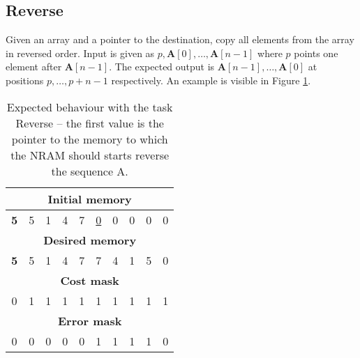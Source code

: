 \subsection{Reverse}
Given an array and a pointer to the destination, copy all elements from the array in reversed order. Input is given as $p, \textbf{A}[0], \dots, \textbf{A}[n-1]$ where $p$ points one element after $\textbf{A}[n-1]$. The expected output is $\textbf{A}[n-1], \dots, \textbf{A}[0]$ at positions $p, \dots, p+n-1$ respectively. An example is visible in Figure \ref{fig:reverse-example}.
\begin{table}[h!]
	\centering
	\begin{tabular}{|c|c|c|c|c|c|c|c|c|c|}
		\hline
		\multicolumn{10}{|c|}{\textbf{Initial memory}} \\ \hline
		\textbf{5} & 5 & 1 & 4 & 7 & \underline{0} & 0 & 0 & 0 & 0 \\ \hline\hline\hline
		\multicolumn{10}{|c|}{\textbf{Desired memory}} \\ \hline
		\textbf{5} & 5 & 1 & 4 & 7 & 7 & 4 & 1 & 5 & 0 \\ \hline\hline\hline
		\multicolumn{10}{|c|}{\textbf{Cost mask}} \\ \hline
		0 & 1 & 1 & 1 & 1 & 1 & 1 & 1 & 1 & 1 \\ \hline\hline\hline
		
		\multicolumn{10}{|c|}{\textbf{Error mask}} \\ \hline
		0 & 0 & 0 & 0 & 0 & 1 & 1 & 1 & 1 & 0 \\ \hline
	\end{tabular}
	\caption{Expected behaviour with the task Reverse -- the first value is the pointer to the memory to which the NRAM should starts reverse the sequence A.}
	\label{fig:reverse-example}
\end{table}
\FloatBarrier
\iffalse

